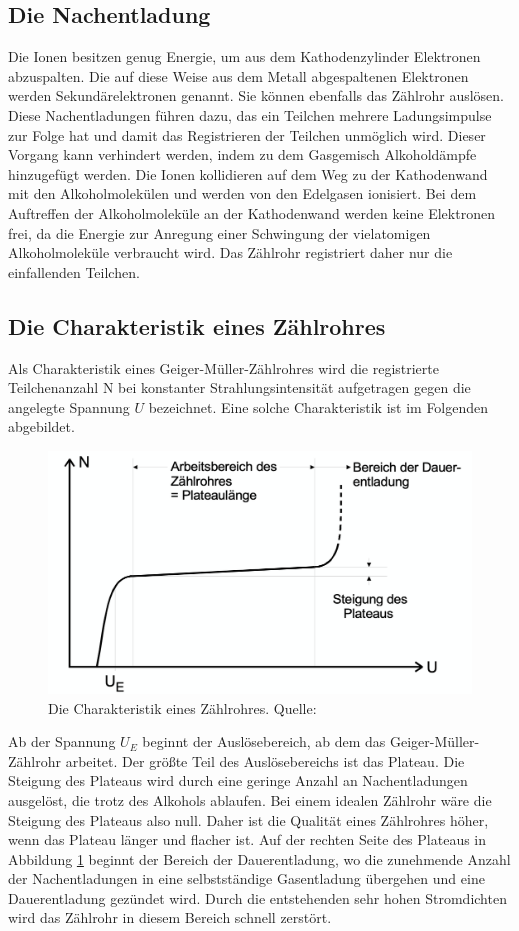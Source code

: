   \subsection{Die Nachentladung}
    Die Ionen besitzen genug Energie, um aus dem Kathodenzylinder Elektronen abzuspalten. Die auf
    diese Weise aus dem Metall abgespaltenen Elektronen werden Sekundärelektronen genannt. Sie können
    ebenfalls das Zählrohr auslösen. Diese Nachentladungen führen dazu, das ein Teilchen mehrere
    Ladungsimpulse zur Folge hat und damit das Registrieren der Teilchen unmöglich wird. Dieser
    Vorgang kann verhindert werden, indem zu dem Gasgemisch Alkoholdämpfe hinzugefügt werden. Die Ionen
    kollidieren auf dem Weg zu der Kathodenwand mit den Alkoholmolekülen und werden von den Edelgasen
    ionisiert. Bei dem Auftreffen der Alkoholmoleküle an der Kathodenwand werden keine Elektronen
    frei, da die Energie zur Anregung einer Schwingung der vielatomigen Alkoholmoleküle verbraucht
    wird. Das Zählrohr registriert daher nur die einfallenden Teilchen.
  \subsection{Die Charakteristik eines Zählrohres}
    Als Charakteristik eines Geiger-Müller-Zählrohres wird die registrierte Teilchenanzahl N
    bei konstanter Strahlungsintensität aufgetragen gegen die angelegte Spannung $U$ bezeichnet. Eine 
    solche Charakteristik ist im Folgenden abgebildet.
    \begin{figure}[H]
      \centering
      \includegraphics[scale=0.6]{content/Charakteristik.png}
      \caption{Die Charakteristik eines Zählrohres. Quelle:\cite{AP01}}
      \label{fig:charakteristik1}
    \end{figure}
    \noindent
    Ab der Spannung $U_{E}$ beginnt der Auslösebereich, ab dem das Geiger-Müller-Zählrohr arbeitet.
    Der größte Teil des Auslösebereichs ist das Plateau. Die Steigung des Plateaus wird durch eine
    geringe Anzahl an Nachentladungen ausgelöst, die trotz des Alkohols ablaufen. Bei einem idealen
    Zählrohr wäre die Steigung des Plateaus also null. Daher ist die Qualität eines Zählrohres höher,
    wenn das Plateau länger und flacher ist. Auf der rechten Seite des Plateaus in Abbildung
    \ref{fig:charakteristik1} beginnt der Bereich der Dauerentladung, wo die zunehmende Anzahl der
    Nachentladungen in eine selbstständige Gasentladung übergehen und eine Dauerentladung gezündet
    wird. Durch die entstehenden sehr hohen Stromdichten wird das Zählrohr in diesem Bereich schnell
    zerstört.
\label{sec:Theorie}

